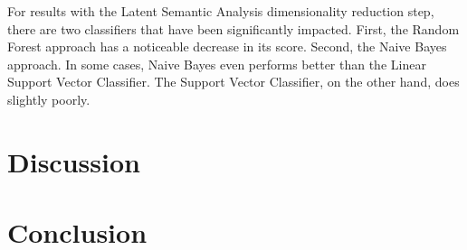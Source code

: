 \documentclass{sig-alternate}
\begin{document}
	For results with the Latent Semantic Analysis dimensionality reduction
	step, there are two classifiers that have been significantly impacted.
	First, the Random Forest approach has a noticeable decrease in its score.
	Second, the Naive Bayes approach. In some cases, Naive Bayes even performs
	better than the Linear Support Vector Classifier. The Support Vector
	Classifier, on the other hand, does slightly poorly.

\section{Discussion} %
\label{sec:Discussion}


\section{Conclusion} %
\label{sec:Conclusion}

\end{document}
